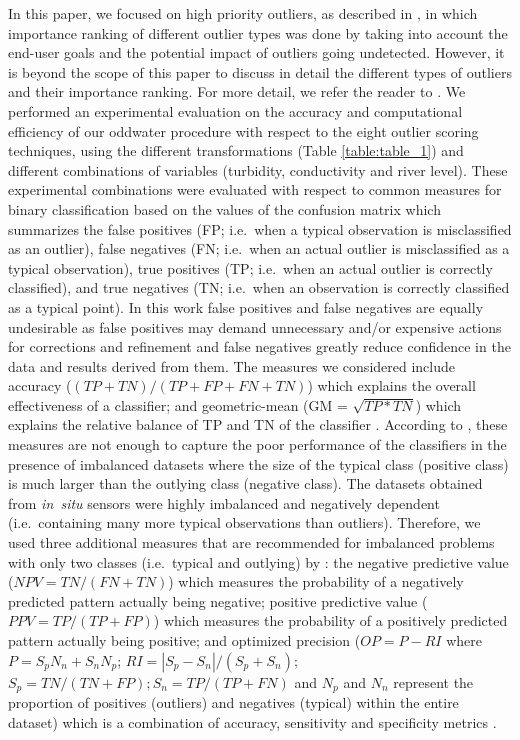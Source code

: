 \documentclass[draft]{agujournal2018} %
\begin{document}
\color{black} In this paper, we focused on high priority outliers, as described in \citet{leigh2019framework}, in which importance ranking of different outlier types was done by taking into account the end-user goals and the potential impact of outliers going undetected. However, it is beyond the scope of this paper to discuss in detail the different types of outliers and their importance ranking. For more detail, we refer the reader to  \citet{leigh2019framework}. \color{black} We performed an experimental evaluation on the accuracy and
computational efficiency of our \color{black} oddwater procedure \color{black} with respect to the
eight outlier scoring techniques, using the different transformations \color{black}(Table \ref{table:table_1}) \color{black}
and different combinations of variables (turbidity, conductivity and
river level). These experimental
combinations were evaluated with respect to common measures for binary
classification based on the values of the confusion matrix which
summarizes the false positives (FP; i.e.~when a typical observation is
misclassified as an outlier), false negatives (FN; i.e.~when an actual
outlier is misclassified as a typical observation), true positives (TP;
i.e.~when an actual outlier is correctly classified), and true negatives
(TN; i.e.~when an observation is correctly classified as a typical
point). \color{black} In this work false positives and false negatives  are equally undesirable as false positives may demand unnecessary and/or expensive actions for corrections and refinement and false negatives greatly reduce confidence in the data and results derived from them. The measures we considered include \color{black} accuracy
(\((TP+TN) / (TP+FP+FN+TN)\)) which explains the overall
effectiveness of a classifier; and geometric-mean (GM = \(\sqrt{TP*TN}\)) which
explains the relative balance of TP and TN of the classifier
\citep{sokolova2009systematic}. According to
\citet{hossin2015review}, these measures are not enough to capture
the poor performance of the classifiers in the presence of imbalanced
datasets where the size of the typical class (positive class) is much
larger than the outlying class (negative class). The datasets obtained
from \emph{in~situ} sensors were highly imbalanced and negatively
dependent (i.e.~containing many more typical observations than
outliers). Therefore, we used three additional measures that are
recommended for imbalanced problems with only two classes (i.e.~typical
and outlying) by \citet{ranawana2006optimized}: the negative
predictive value (\(NPV = TN/(FN+TN)\)) which measures the
probability of a negatively predicted pattern actually being negative;
positive predictive value (\(PPV = TP/(TP+FP)\)) which measures the
probability of a positively predicted pattern actually being positive;
and optimized precision \color{black} (\(OP = P- RI \) where \(P = S_{p}N_{n} + S_{n}N_{p}\); \(RI = |S_{p}-S_{n}|/(S_{p} + S_{n})\); \(S_{p} = TN/(TN+FP); S_{n} = TP/(TP+FN)\) and \(N_{p}\) and \(N_{n}\) represent the proportion of positives (outliers) and negatives (typical) within the  entire dataset) \color{black} which is a combination of accuracy,
sensitivity and specificity metrics \citep{ranawana2006optimized}.
\end{document}
